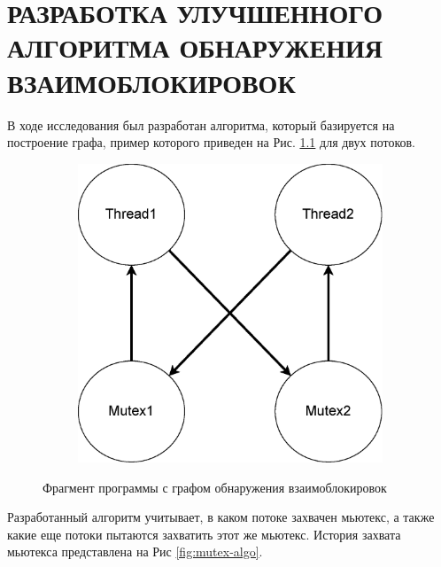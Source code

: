 \chapter{\MakeUppercase{Разработка улучшенного алгоритма обнаружения взаимоблокировок}}

В ходе исследования был разработан алгоритма, который базируется на построение графа, пример которого приведен на Рис. \ref{fig:my_alg-2m2t} для двух потоков.


\begin{figure}[h]
    \centering
    \begin{subfigure}[h]{0.4\textwidth}
        \centering
        
    \end{subfigure}
    \hfill
    \begin{subfigure}[h]{0.4\textwidth}
        \centering
        \includegraphics[width=\textwidth]{inc/chapter-second/my_alg-2m2t.eps}
    \end{subfigure}
    \caption{Фрагмент программы с графом обнаружения взаимоблокировок}
    \label{fig:my_alg-2m2t}
\end{figure}

Разработанный алгоритм учитывает, в каком потоке захвачен мьютекс, а также какие еще потоки пытаются захватить этот же мьютекс. История захвата мьютекса представлена на Рис \ref{fig:mutex-algo}.

